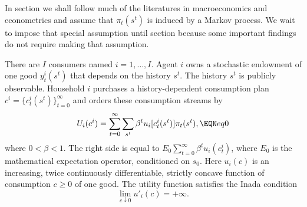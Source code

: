  In section  we shall follow much of the
 literatures in macroeconomics and econometrics and assume that
 $\pi_t(s^t)$ is induced by  a Markov process. We wait to impose
 that special assumption until section  because some important findings do not
 require making that assumption.




There are $I$ consumers named $i=1, \ldots , I$. Agent $i$
owns a stochastic endowment of one good
$y_t^i(s^t)$ that depends on the
history $s^t$.
The history $s^t$ is publicly observable.
Household $i$
purchases a history-dependent  consumption plan $c^i =
 \{c_t^i(s^t)\}_{t=0}^\infty$ and
orders these
consumption streams by
%
%
$$ U_i(c^i) =
   \sum_{t=0}^\infty \sum_{s^t} \beta^t u_i[c_t^i(s^t)]
   \pi_t(s^t),
 \EQN eq0 $$
 where $0 < \beta < 1$.
The right side is equal to $ E_0 \sum_{t=0}^\infty \beta^t
u_i(c_t^i) $, where $E_0$ is the mathematical expectation operator,
conditioned on $s_0$. Here $u_i(c)$ is an increasing, twice
continuously differentiable, strictly concave function of
consumption $c\geq 0$  of one good. The utility function satisfies
the Inada condition
$$ \lim_{c \downarrow 0} u'_i(c) = +\infty.$$


